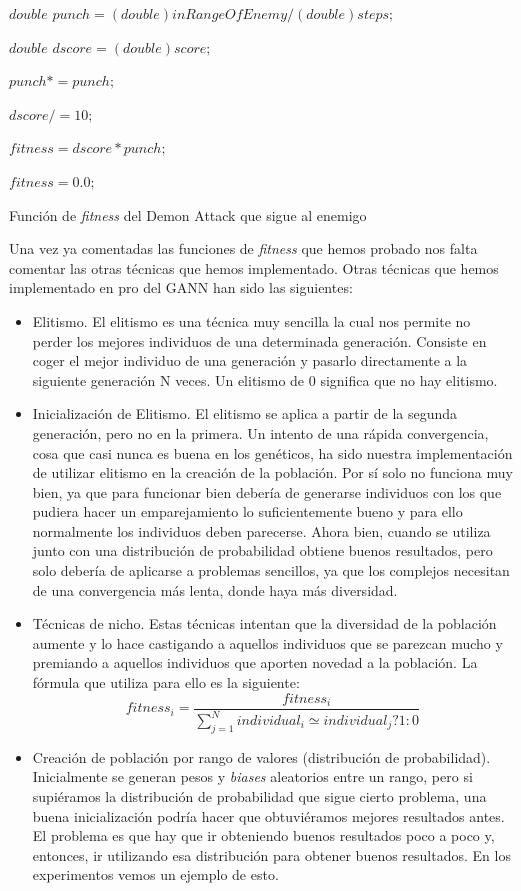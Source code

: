 \begin{algorithm}
    {
        $double$ $punch = (double)inRangeOfEnemy / (double)steps;$
        
        $double$ $dscore = (double)score;$
        
        $punch *= punch;$
        
        $dscore /= 10;$
        
        $fitness = dscore * punch;$
    }
    {
        $fitness = 0.0;$
    }
    \caption{Función de \textit{fitness} del Demon Attack que sigue al enemigo}
    \label{alg:fitnessFunctionDemonAttackFollowingEnemy}
\end{algorithm}

\newpage
Una vez ya comentadas las funciones de \textit{fitness} que hemos probado nos falta comentar las otras técnicas que hemos implementado. Otras técnicas que hemos implementado en pro del GANN han sido las siguientes:

\begin{itemize}
    \item Elitismo. El elitismo es una técnica muy sencilla la cual nos permite no perder los mejores individuos de una determinada generación. Consiste en coger el mejor individuo de una generación y pasarlo directamente a la siguiente generación N veces. Un elitismo de 0 significa que no hay elitismo.
    \item Inicialización de Elitismo. El elitismo se aplica a partir de la segunda generación, pero no en la primera. Un intento de una rápida convergencia, cosa que casi nunca es buena en los genéticos, ha sido nuestra implementación de utilizar elitismo en la creación de la población. Por sí solo no funciona muy bien, ya que para funcionar bien debería de generarse individuos con los que pudiera hacer un emparejamiento lo suficientemente bueno y para ello normalmente los individuos deben parecerse. Ahora bien, cuando se utiliza junto con una distribución de probabilidad obtiene buenos resultados, pero solo debería de aplicarse a problemas sencillos, ya que los complejos necesitan de una convergencia más lenta, donde haya más diversidad.
    \item Técnicas de nicho. Estas técnicas intentan que la diversidad de la población aumente y lo hace castigando a aquellos individuos que se parezcan mucho y premiando a aquellos individuos que aporten novedad a la población. La fórmula que utiliza para ello es la siguiente:
        \[fitness_{i}=\dfrac{fitness_{i}}{\sum_{j=1}^{N}{individual_{i} \simeq  individual_{j} ? 1 : 0}}\]
    \item Creación de población por rango de valores (distribución de probabilidad). Inicialmente se generan pesos y \textit{biases} aleatorios entre un rango, pero si supiéramos la distribución de probabilidad que sigue cierto problema, una buena inicialización podría hacer que obtuviéramos mejores resultados antes. El problema es que hay que ir obteniendo buenos resultados poco a poco y, entonces, ir utilizando esa distribución para obtener buenos resultados. En los experimentos vemos un ejemplo de esto.
\end{itemize}

